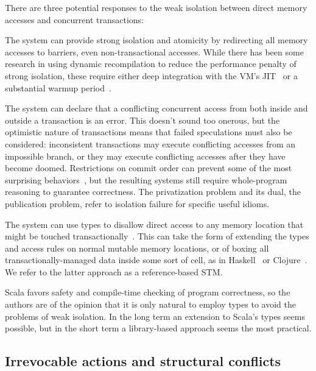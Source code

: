 There are three potential responses to the weak isolation between direct memory
accesses and concurrent transactions:
\begin{packed_itemize}

\item The system can provide strong isolation and atomicity by redirecting
all memory accesses to barriers, even non-transactional accesses.
While there has been some research in using dynamic recompilation
to reduce the performance penalty of strong isolation, these require
either deep integration with the VM's JIT~\cite{schneider08dynamic}
or a substantial warmup period~\cite{bronson09dbo}.

\item The system can declare that a conflicting concurrent access
from both inside and outside a transaction is an error.  This doesn't
sound too onerous, but the optimistic nature of transactions means that
failed speculations must also be considered: inconsistent transactions
may execute conflicting accesses from an impossible branch, or they
may execute conflicting accesses after they have become doomed.
Restrictions on commit order can prevent some of the most surprising
behaviors~\cite{sgla08}, but the resulting systems still require
whole-program reasoning to guarantee correctness.  The privatization
problem and its dual, the publication problem, refer to isolation failure
for specific useful idioms.

\item The system can use types to disallow direct access to any memory
location that might be touched transactionally~\cite{moore08semantics}.
This can take the form of extending the types and access rules on
normal mutable memory locations, or
of boxing all transactionally-managed data inside some sort of cell,
as in Haskell~\cite{harris05composable} or Clojure~\cite{clojure}.  We refer to the latter
approach as a reference-based STM.

\end{packed_itemize}

Scala favors safety and compile-time checking of program correctness,
so the authors are of the opinion that it is only natural to employ types
to avoid the problems of weak isolation.  In the long term an extension
to Scala's types seems possible, but in the short term a library-based
approach seems the most practical.

\subsection{Irrevocable actions and structural conflicts}

